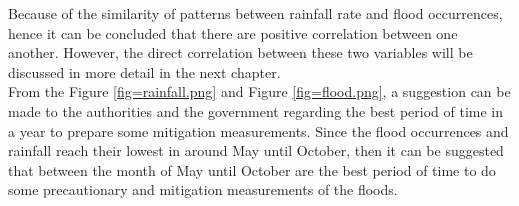 \noindent
Because of the similarity of patterns between rainfall rate and flood occurrences, hence it can be concluded that there are positive correlation between one another. However, the direct correlation between these two variables will be discussed in more detail in the next chapter. \\

\noindent
From the Figure \ref{fig=rainfall.png} and Figure  \ref{fig=flood.png}, a suggestion can be made to the authorities and the government regarding the best period of time in a year to prepare some mitigation measurements. Since the flood occurrences and rainfall reach their lowest in around May until October, then it can be suggested that between the month of May until October are the best period of time to do some precautionary and mitigation measurements of the floods.\\


